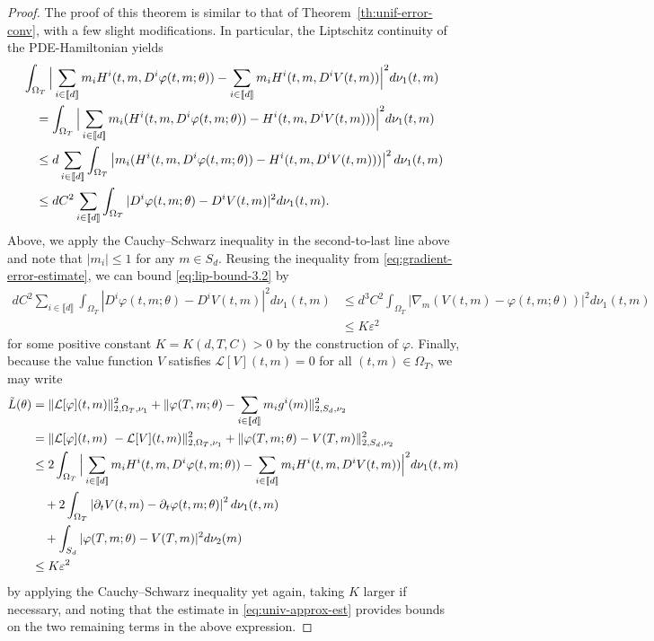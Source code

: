\documentclass[11pt,reqno]{amsart}
\numberwithin{equation}{section}
\theoremstyle{plain}
\newcommand{\sL}{\mathcal{L}}
\newcommand{\lbrs}[1]{\llbracket #1 \rrbracket}
\begin{document}
\begin{proof}
The proof of this theorem is similar to that of Theorem~\ref{th:unif-error-conv}, with a few slight modifications. In particular, the Liptschitz continuity of the PDE-Hamiltonian yields
\begin{align}
    \label{eq:lip-bound-3.2}
    &\int_{\Omega_T} \Big|\sum_{i \in \lbrs{d}} m_i H^i(t, m, D^i \varphi(t, m; \theta)) - \sum_{i \in \lbrs{d}} m_i H^i(t, m, D^i V(t, m))\Big|^2 d\nu_1(t,m) \notag \\
    &\quad =\int_{\Omega_T} \Big|\sum_{i \in \lbrs{d}} m_i (H^i(t, m, D^i \varphi(t, m; \theta)) - H^i(t, m, D^i V(t, m)))\Big|^2 d\nu_1(t,m) \notag \\
    &\quad \leq d \sum_{i \in \lbrs{d}} \int_{\Omega_T} \left|m_i (H^i(t, m, D^i \varphi(t, m; \theta)) - H^i(t, m, D^i V(t, m)))\right|^2 d\nu_1(t,m)\notag \\
    &\quad \leq dC^2 \sum_{i \in \lbrs{d}} \int_{\Omega_T} |D^i \varphi(t, m; \theta) - D^iV(t,m)|^2 d\nu_1(t,m).
\end{align}
Above, we apply the Cauchy--Schwarz inequality in the second-to-last line above and note that $|m_i| \leq 1$ for any $m \in S_d$. Reusing the inequality from \eqref{eq:gradient-error-estimate}, we can bound \eqref{eq:lip-bound-3.2} by
\begin{align*}
    dC^2 \sum_{i \in \lbrs{d}} \int_{\Omega_T} |D^i \varphi(t, m; \theta) - D^iV(t,m)|^2 d\nu_1(t,m) &\leq d^3 C^2 \int_{\Omega_T} |\nabla_m (V(t,m) - \varphi(t,m; \theta))|^2d\nu_1(t,m) \\
    &\leq K \varepsilon^2
\end{align*}
for some positive constant $K = K(d, T, C) > 0$ by the construction of $\varphi$. Finally, because the value function $V$ satisfies $\sL[V](t,m) = 0$ for all $(t,m) \in \Omega_T$, we may write
\begin{align*}
    \Tilde{L}(\theta) &= \|\sL[\varphi](t,m)\|_{2, \Omega_T, \nu_1}^2 + \|\varphi(T, m; \theta) - \sum_{i \in \lbrs{d}} m_i g^i(m)\|_{2, S_d, \nu_2}^2 \\
    &= \|\sL[\varphi](t,m)\ - \sL[V](t,m)\|_{2, \Omega_T, \nu_1}^2 + \|\varphi(T, m; \theta) - V(T, m)\|_{2, S_d, \nu_2}^2 \\
    &\leq 2\int_{\Omega_T} \Big|\sum_{i \in \lbrs{d}} m_i H^i(t, m, D^i \varphi(t, m; \theta)) - \sum_{i \in \lbrs{d}} m_i H^i(t, m, D^i V(t, m))\Big|^2 d\nu_1(t,m) \\
    &\quad + 2\int_{\Omega_T} \left|\partial_t V(t,m) - \partial_t \varphi(t,m;\theta)\right|^2 d\nu_1(t,m) \\
    &\quad + \int_{S_d} |\varphi(T, m; \theta) - V(T, m)|^2 d\nu_2(m) \\
    &\leq K \varepsilon^2
\end{align*}
by applying the Cauchy--Schwarz inequality yet again, taking $K$ larger if necessary, and noting that the estimate in \eqref{eq:univ-approx-est} provides bounds on the two remaining terms in the above expression.
\end{proof}
\end{document}
